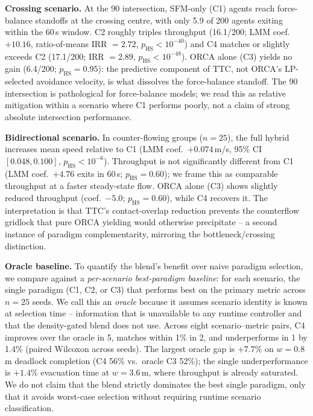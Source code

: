 \documentclass[a4paper,twoside]{article}
\begin{document}
\textbf{Crossing scenario.}
At the 90\textdegree{} intersection, SFM-only (C1) agents reach force-balance standoffs at the crossing centre, with only 5.9 of 200 agents exiting within the 60\,s window. C2 roughly triples throughput (16.1/200; LMM coef.\ $+10.16$, ratio-of-means IRR $=2.72$, $p_{\mathrm{HS}}\!<\!10^{-40}$) and C4 matches or slightly exceeds C2 (17.1/200; IRR $=2.89$, $p_{\mathrm{HS}}\!<\!10^{-48}$). ORCA alone (C3) yields no gain (6.4/200; $p_{\mathrm{HS}}{=}0.95$): the predictive component of TTC, not ORCA's LP-selected avoidance velocity, is what dissolves the force-balance standoff. The 90\textdegree{} intersection is pathological for force-balance models; we read this as relative mitigation within a scenario where C1 performs poorly, not a claim of strong absolute intersection performance.

\textbf{Bidirectional scenario.}
In counter-flowing groups ($n=25$), the full hybrid increases mean speed relative to C1 (LMM coef.\ $+0.074$\,m/s, 95\% CI $[0.048,0.100]$, $p_{\mathrm{HS}}\!<\!10^{-6}$). Throughput is not significantly different from C1 (LMM coef.\ $+4.76$ exits in 60\,s; $p_{\mathrm{HS}}{=}0.60$); we frame this as comparable throughput at a faster steady-state flow. ORCA alone (C3) shows slightly reduced throughput (coef.\ $-5.0$; $p_{\mathrm{HS}}{=}0.60$), while C4 recovers it. The interpretation is that TTC's contact-overlap reduction prevents the counterflow gridlock that pure ORCA yielding would otherwise precipitate -- a second instance of paradigm complementarity, mirroring the bottleneck/crossing distinction.

\textbf{Oracle baseline.}
To quantify the blend's benefit over naive paradigm selection, we compare against a \emph{per-scenario best-paradigm baseline}: for each scenario, the single paradigm (C1, C2, or C3) that performs best on the primary metric across $n=25$ seeds. We call this an \emph{oracle} because it assumes scenario identity is known at selection time -- information that is unavailable to any runtime controller and that the density-gated blend does not use. Across eight scenario--metric pairs, C4 improves over the oracle in 5, matches within 1\% in 2, and underperforms in 1 by 1.4\% (paired Wilcoxon across seeds). The largest oracle gap is $+7.7\%$ on $w=0.8$\,m deadlock completion (C4 56\% vs.\ oracle C3 52\%); the single underperformance is $+1.4\%$ evacuation time at $w=3.6$\,m, where throughput is already saturated. We do not claim that the blend strictly dominates the best single paradigm, only that it avoids worst-case selection without requiring runtime scenario classification.
\end{document}
